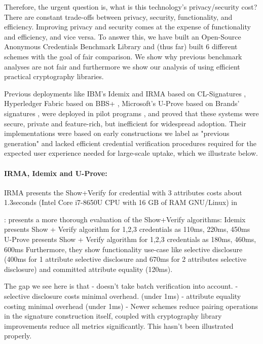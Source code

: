 Therefore, the urgent question is, what is this technology's privacy/security cost? There are constant trade-offs between privacy, security, functionality, and efficiency. Improving privacy and security comes at the expense of functionality and efficiency, and vice versa. To answer this, we have built an Open-Source Anonymous Credentials Benchmark Library and (thus far) built 6 different schemes with the goal of fair comparison. We show why previous benchmark analyses are not fair and furthermore we show our analysis of using efficient practical cryptography libraries.  

Previous deployments like IBM's Idemix \cite{camenisch_design_2002} and IRMA \cite{fischer-hubner_towards_2013} based on CL-Signatures \cite{camenisch_design_2002, cimato_signature_2003}, Hyperledger Fabric \cite{androulaki_hyperledger_2018} based on BBS+ \cite{hutchison_constant-size_2006}, Microsoft's U-Prove \cite{dunkelman_formal_2016} based on Brands' signatures \cite{brands_rethinking_2000}, were deployed in pilot programs \cite{dunkelman_formal_2016}, and proved that these systems were secure, private and feature-rich, but inefficient for widespread adoption. Their implementations were based on early constructions we label as "previous generation" and lacked efficient credential verification procedures required for the expected user experience needed for large-scale uptake, which we illustrate below.

\paragraph{IRMA, Idemix and U-Prove: }

IRMA \cite{fischer-hubner_towards_2013} presents the Show+Verify for credential with 3 attributes costs about 1.3seconds (Intel Core i7-8650U CPU with 16 GB of RAM GNU/Linux) in \cite{zhang_passo_2021}

\cite{habib_evaluation_2016}: presents a more thorough evaluation of the Show+Verify algorithms:
Idemix presents Show + Verify algorithm for 1,2,3 credentials as 110ms, 220ms, 450ms
U-Prove presents Show + Verify algorithm for 1,2,3 credentials as 180ms, 460ms, 600ms
Furthermore, they show functionality use-case like selective disclosure (400ms for 1 attribute selective disclosure and 670ms for 2 attributes selective disclosure) and committed attribute equality (120ms). 

The gap we see here is that 
- doesn't take batch verification into account.
- selective disclosure costs minimal overhead. (under 1ms)
- attribute equality costing minimal overhead (under 1ms)
- Newer schemes \cite{camenisch_anonymous_2016, tomescu_utt_2022} reduce pairing operations in the signature construction itself, coupled with cryptography library improvements reduce all metrics significantly. 
This hasn't been illustrated properly. 

